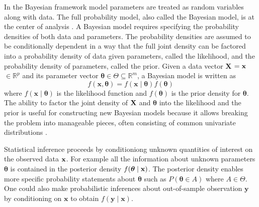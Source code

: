 \documentclass[12pt]{article}
\begin{document}
In the Bayesian framework model parameters are treated as random variables
along with data. The full probability model, also called the Bayesian
model, is at the center of analysis
\citep{GelCar2013}. A Bayesian model requires specifying
the probability densities of both data and
parameters. The probability densities are assumed to be conditionally dependent in a way that the full joint density can
be factored into a probability density of data given parameters,
called the likelihood, and the probability density of parameters,
called the prior. Given a data vector $\boldsymbol{X}$ $=\bf{x}$ $\in \mathbb{R}^p$ and
its parameter vector $\boldsymbol{\theta} \in \Theta \subseteq
\mathbb{R}^m$, a Bayesian model is written as
%
\begin{equation} f(\boldsymbol{x}, \boldsymbol{\theta}) =
      f(\boldsymbol{x} \mid \boldsymbol{\theta})f(\boldsymbol{\theta}) 
\end{equation} 
%
where $f(\boldsymbol{x} \mid \boldsymbol{\theta})$ is the likelihood
function and $f(\boldsymbol{\theta})$ is the prior density for
$\boldsymbol{\theta}$. The ability to factor the joint density of
$\bf{X}$ and $\boldsymbol{\theta}$ into the likelihood and the prior is
useful for constructing new Bayesian models because it allows breaking
the problem into manageable pieces, often consisting of common
univariate distributions \citep{JohKot1994,JohKot1995}.

Statistical inference proceeds by conditioniong unknown quantities of interest on the observed data $\bf{x}$. For example all the information about unknown parameters $\boldsymbol{\theta}$ is contained in the posterior density $f(\boldsymbol{\theta} \mid \bf{x})$. The posterior density enables more specific probability statements about $\boldsymbol{\theta}$ such as $P(\boldsymbol{\theta} \in A)$ where $A \in \Theta$. One could also make probabilistic inferences about out-of-sample observation $\boldsymbol{y}$ by conditioning on $\boldsymbol{x}$ to obtain $f(\boldsymbol{y} \mid \boldsymbol{x})$.
\end{document}

